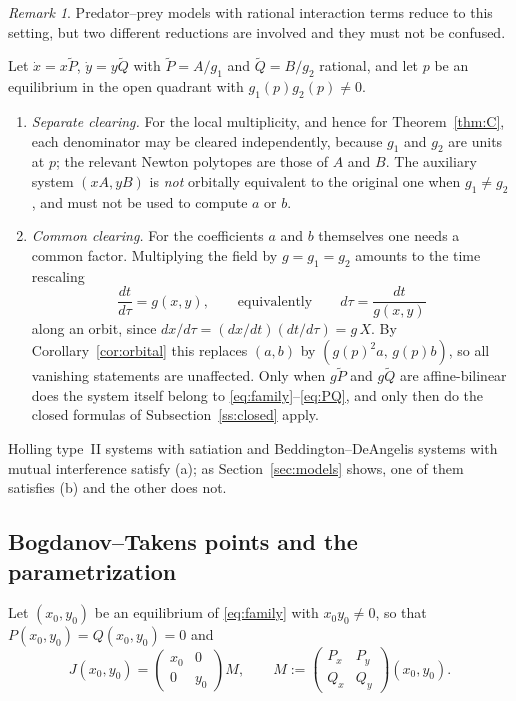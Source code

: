 \documentclass[12pt]{article}
\theoremstyle{plain}
\theoremstyle{definition}
\theoremstyle{remark}
\newtheorem{remark}[theorem]{Remark}
\begin{document}
	\begin{remark}\label{rem:origin}
		Predator--prey models with rational interaction terms reduce to this
		setting, but two different reductions are involved and they must not be
		confused.
		
		Let $\dot x=x\widetilde P$, $\dot y=y\widetilde Q$ with
		$\widetilde P=A/g_{1}$ and $\widetilde Q=B/g_{2}$ rational, and let $p$
		be an equilibrium in the open quadrant with $g_{1}(p)g_{2}(p)\neq0$.
		\begin{enumerate}[label=\rm(\alph*)]
			\item \emph{Separate clearing.}  For the local multiplicity, and hence
			for Theorem~\ref{thm:C}, each denominator may be cleared
			independently, because $g_{1}$ and $g_{2}$ are units at $p$; the
			relevant Newton polytopes are those of $A$ and $B$.  The auxiliary
			system $(xA,yB)$ is \emph{not} orbitally equivalent to the original one
			when $g_{1}\neq g_{2}$, and must not be used to compute $a$ or $b$.
			\item \emph{Common clearing.}  For the coefficients $a$ and $b$
			themselves one needs a common factor.  Multiplying the field by
			$g=g_{1}=g_{2}$ amounts to the time rescaling
			\[
			\frac{dt}{d\tau}=g(x,y),
			\qquad\text{equivalently}\qquad
			d\tau=\frac{dt}{g(x,y)}
			\]
			along an orbit, since $dx/d\tau=(dx/dt)(dt/d\tau)=g\,X$.  By
			Corollary~\ref{cor:orbital} this replaces $(a,b)$ by
			$(g(p)^{2}a,\,g(p)b)$, so all vanishing statements are unaffected.  Only when $g\widetilde P$ and
			$g\widetilde Q$ are affine-bilinear does the system itself belong to
			\eqref{eq:family}--\eqref{eq:PQ}, and only then do the closed formulas
			of Subsection~\ref{ss:closed} apply.
		\end{enumerate}
		Holling type~II systems with satiation \cite{HollingTypeII,Bazykin1998}
		and Beddington--DeAngelis systems with mutual interference
		\cite{BeddingtonDeAngelis,DeAngelisGoldsteinONeill} satisfy (a); as
		Section~\ref{sec:models} shows, one of them satisfies (b) and the other
		does not.
	\end{remark}
	
	\subsection{Bogdanov--Takens points and the parametrization}
	
	Let $(x_{0},y_{0})$ be an equilibrium of \eqref{eq:family} with
	$x_{0}y_{0}\neq0$, so that $P(x_{0},y_{0})=Q(x_{0},y_{0})=0$ and
	\begin{equation}\label{eq:Jfactor}
		J(x_{0},y_{0})
		=\begin{pmatrix}x_{0}&0\\0&y_{0}\end{pmatrix}M,\qquad
		M:=\begin{pmatrix}P_{x}&P_{y}\\ Q_{x}&Q_{y}\end{pmatrix}(x_{0},y_{0}) .
	\end{equation}
	
\end{document}
